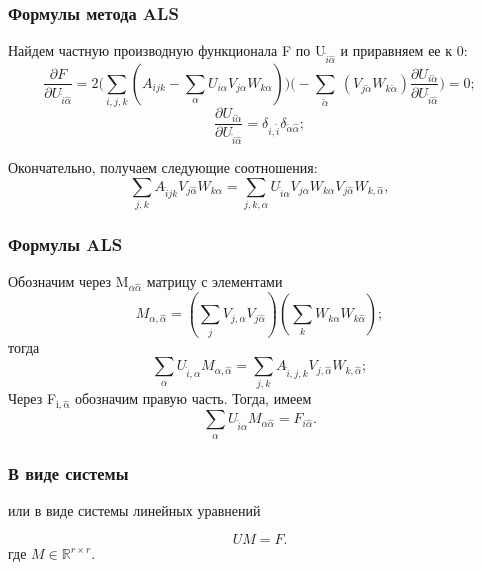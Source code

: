 \documentclass[presentation]{beamer}
\begin{document}
\begin{frame}
\frametitle{Формулы метода ALS}
\label{sec-1-14}


Найдем частную производную функционала F по U$_{\hat i\hat\alpha}$ и приравняем ее к 0:
\begin{equation*}
\frac{\partial F}{\partial U_{\hat i \hat \alpha}} = 
2 \Big( \sum_{i,j,k} (A_{ijk}-\sum_{\alpha} U_{i \alpha}V_{j\alpha}W_{k\alpha})\Big)\Big(-
\sum_{\check \alpha}\ (V_{j\check \alpha}W_{k\check \alpha})
\frac{\partial U_{i \check \alpha}}{\partial U_{\hat i \hat \alpha}}\Big) =0;
\end{equation*}
\begin{equation*}
\frac{\partial U_{i \check \alpha}}{\partial U_{\hat i \hat \alpha}} =
\delta_{i,\hat i}\delta_{\check \alpha \hat \alpha};
\end{equation*}

Окончательно, получаем следующие соотношения:
\begin{equation*}
\sum_{j,k} A_{\hat ijk}V_{j \hat \alpha}W_{k\hat \alpha}=
\sum_{j,k,\alpha} U_{\hat i\alpha}V_{j\alpha}W_{k\alpha}V_{j\hat \alpha}
W_{k,\hat \alpha},
\end{equation*}
\end{frame}
\begin{frame}
\frametitle{Формулы ALS}
\label{sec-1-15}

Обозначим через M$_{\alpha \hat \alpha}$
матрицу с элементами
\begin{equation}\label{curs:lev}
M_{\alpha,\hat \alpha} = (\sum_{j}V_{j,\alpha}
V_{j\hat \alpha}) (\sum_{k}W_{k\alpha}W_{k\hat \alpha});
\end{equation}
тогда
\begin{equation}\label{curs:prav}
\sum_{\alpha} U_{\hat i, \alpha}M_{\alpha,\hat \alpha} = 
\sum_{j,k} A_{\hat i,j,k}V_{j, \hat \alpha}W_{k,\hat \alpha};
\end{equation}
Через  F$_{\mathrm{i,\hat \alpha}}$ обозначим правую часть. Тогда, имеем
\begin{equation}
\sum_{\alpha} U_{\hat i \alpha}M_{\alpha \hat \alpha}=F_{i \hat \alpha}.
\end{equation}
\end{frame}
\begin{frame}
\frametitle{В виде системы}
\label{sec-1-16}

или в виде системы линейных уравнений

\begin{equation}\label{curs:q5}
U M = F.
\end{equation}
где $M \in \mathbb{R}^{r \times r}$. 
\end{frame}
\end{document}
